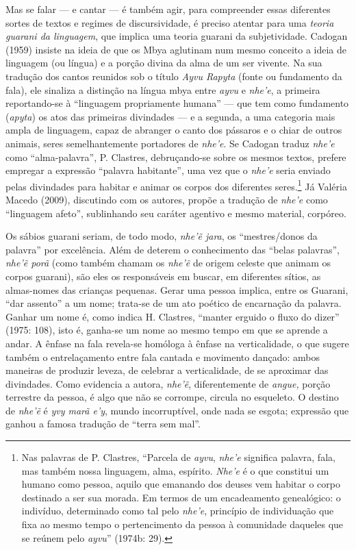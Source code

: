 Mas se falar --- e cantar --- é também agir, para compreender essas
diferentes sortes de textos e regimes de discursividade, é preciso
atentar para uma \emph{teoria guarani da linguagem}, que implica uma
teoria guarani da subjetividade. Cadogan (1959) insiste na ideia de que
os Mbya aglutinam num mesmo conceito a ideia de linguagem (ou língua) e
a porção divina da alma de um ser vivente. Na sua tradução dos cantos
reunidos sob o título \emph{Ayvu Rapyta} (fonte ou fundamento da fala),
ele sinaliza a distinção na língua mbya entre \emph{ayvu} e
\emph{nhe'e}, a primeira reportando-se à ``linguagem propriamente
humana'' --- que tem como fundamento (\emph{apyta}) os atos das
primeiras divindades --- e a segunda, a uma categoria mais ampla de
linguagem, capaz de abranger o canto dos pássaros e o chiar de outros
animais, seres semelhantemente portadores de \emph{nhe'e}. Se Cadogan
traduz \emph{nhe'e} como ``alma-palavra'', P. Clastres, debruçando-se
sobre os mesmos textos, prefere empregar a expressão ``palavra
habitante'', uma vez que o \emph{nhe'e} seria enviado pelas divindades
para habitar e animar os corpos dos diferentes seres.\footnote{Nas
  palavras de P. Clastres, ``Parcela de \emph{ayvu}, \emph{nhe'e}
  significa palavra, fala, mas também nossa linguagem, alma, espírito.
  \emph{Nhe'e} é o que constitui um humano como pessoa, aquilo que
  emanando dos deuses vem habitar o corpo destinado a ser sua morada. Em
  termos de um encadeamento genealógico: o indivíduo, determinado como
  tal pelo \emph{nhe'e}, princípio de individuação que fixa ao mesmo
  tempo o pertencimento da pessoa à comunidade daqueles que se reúnem
  pelo \emph{ayvu}'' (1974b: 29).} Já Valéria Macedo (2009), discutindo
com os autores, propõe a tradução de \emph{nhe'e} como ``linguagem
afeto'', sublinhando seu caráter agentivo e mesmo material, corpóreo.

Os sábios guarani seriam, de todo modo, \emph{nhe'ẽ jara}, os
``mestres/donos da palavra'' por excelência. Além de deterem o
conhecimento das ``belas palavras'', \emph{nhe'ẽ porã} (como também
chamam os \emph{nhe'ẽ} de origem celeste que animam os corpos guarani),
são eles os responsáveis em buscar, em diferentes sítios, as almas-nomes
das crianças pequenas. Gerar uma pessoa implica, entre os Guarani, ``dar
assento'' a um nome; trata-se de um ato poético de encarnação da
palavra. Ganhar um nome é, como indica H. Clastres, ``manter erguido o
fluxo do dizer'' (1975: 108), isto é, ganha-se um nome ao mesmo tempo em
que se aprende a andar. A ênfase na fala revela-se homóloga à ênfase na
verticalidade, o que sugere também o entrelaçamento entre fala cantada e
movimento dançado: ambos maneiras de produzir leveza, de celebrar a
verticalidade, de se aproximar das divindades. Como evidencia a autora,
\emph{nhe'ẽ}, diferentemente de \emph{angue,} porção terrestre da
pessoa, é algo que não se corrompe, circula no esqueleto. O destino de
\emph{nhe'ẽ} é \emph{yvy marã e'y}, mundo incorruptível, onde nada se
esgota; expressão que ganhou a famosa tradução de ``terra sem mal''.

